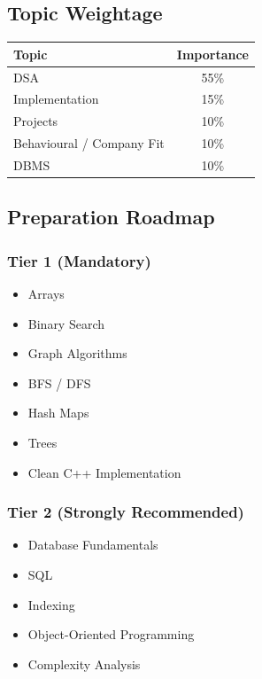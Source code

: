 \documentclass[11pt,a4paper]{article}
\begin{document}

\subsection{Topic Weightage}

\begin{center}
	\begin{tabular}{|l|c|}
		\hline
		Topic & Importance \\
		\hline
		DSA & 55\% \\
		Implementation & 15\% \\
		Projects & 10\% \\
		Behavioural / Company Fit & 10\% \\
		DBMS & 10\% \\
		\hline
	\end{tabular}
\end{center}


\subsection{Preparation Roadmap}

\subsubsection{Tier 1 (Mandatory)}

\begin{itemize}
	\item Arrays
	\item Binary Search
	\item Graph Algorithms
	\item BFS / DFS
	\item Hash Maps
	\item Trees
	\item Clean C++ Implementation
\end{itemize}

\subsubsection{Tier 2 (Strongly Recommended)}

\begin{itemize}
	\item Database Fundamentals
	\item SQL
	\item Indexing
	\item Object-Oriented Programming
	\item Complexity Analysis
\end{itemize}
\end{document}
